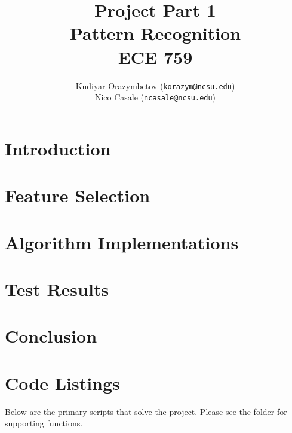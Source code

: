 \documentclass[]{ncmathy}
\newcommand{\theassignment}{Project Part 1}
\newcommand{\thecourse}{Pattern Recognition\\ECE 759}
\begin{document}
\title{\theassignment\\\thecourse}
\author{Kudiyar Orazymbetov (\texttt{korazym@ncsu.edu})\\Nico Casale (\texttt{ncasale@ncsu.edu})}

\makeFancyTitle

\tableofcontents
\listoffigures
\lstlistoflistings

\pagebreak

\section{Introduction} 
	

\section{Feature Selection}
	

\section{Algorithm Implementations}
	
	

\section{Test Results}
	

\section{Conclusion}
	




\section{Code Listings}

Below are the primary scripts that solve the project. Please see the
 folder for supporting functions.

%
\end{document}
